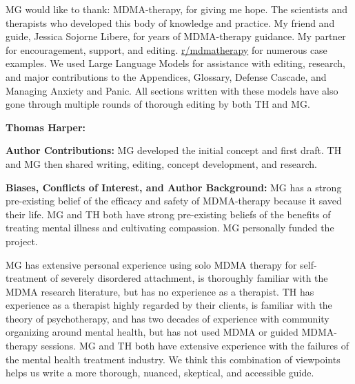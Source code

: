 \documentclass[12pt,letterpaper]{article}
\begin{document}
MG would like to thank: MDMA-therapy, for giving me hope. The scientists and therapists who developed this body of knowledge and practice. My friend and guide, Jessica Sojorne Libere, for years of MDMA-therapy guidance. My partner for encouragement, support, and editing. \href{https://www.reddit.com/r/mdmatherapy}{r/mdmatherapy} for numerous case examples. We used Large Language Models for assistance with editing, research, and major contributions to the Appendices, Glossary, Defense Cascade, and Managing Anxiety and Panic. All sections written with these models have also gone through multiple rounds of thorough editing by both TH and MG.

\textbf{Thomas Harper:}

\vspace{\baselineskip}

\textbf{Author Contributions:} MG developed the initial concept and first draft. TH and MG then shared writing, editing, concept development, and research.

\textbf{Biases, Conflicts of Interest, and Author Background:} MG has a strong pre-existing belief of the efficacy and safety of MDMA-therapy because it saved their life. MG and TH both have strong pre-existing beliefs of the benefits of treating mental illness and cultivating compassion. MG personally funded the project.

MG has extensive personal experience using solo MDMA therapy for self-treatment of severely disordered attachment, is thoroughly familiar with the MDMA research literature, but has no experience as a therapist. TH has experience as a therapist highly regarded by their clients, is familiar with the theory of psychotherapy, and has two decades of experience with community organizing around mental health, but has not used MDMA or guided MDMA-therapy sessions. MG and TH both have extensive experience with the failures of the mental health treatment industry. We think this combination of viewpoints helps us write a more thorough, nuanced, skeptical, and accessible guide.
\end{document}
